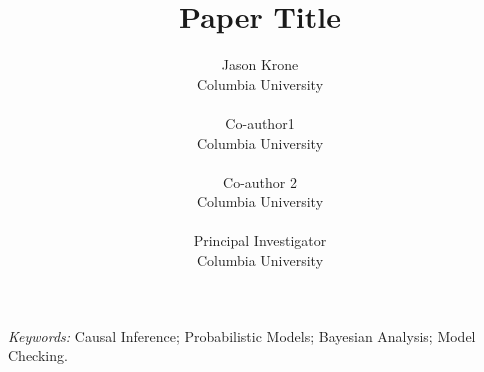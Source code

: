 \documentclass[12pt]{article}
\title{%
\textbf{Paper Title}
}
\author{
Jason Krone \\
Columbia University \\
\\
Co-author1 \\
Columbia University \\
\\
Co-author 2 \\
Columbia University \\
\\
Principal Investigator \\
Columbia University \\
}
\begin{document}
\maketitle
\bigskip



\emph{Keywords:}
Causal Inference;
Probabilistic Models;
Bayesian Analysis;
Model Checking.

\clearpage
\glsresetall{}



\clearpage



\clearpage



\clearpage



\clearpage






\clearpage
\appendix

%
\end{document}
